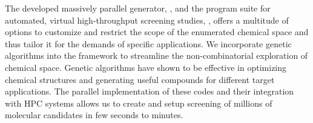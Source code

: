 \label{sec:conclusions4}

The developed massively parallel generator, \chemlg, and the program suite for automated, virtual high-throughput screening studies, \chemhtps, offers a multitude of options to customize and restrict the scope of the enumerated chemical space and thus tailor it for the demands of specific applications. We incorporate genetic algorithms into the framework to streamline the non-combinatorial exploration of chemical space. Genetic algorithms have shown to be effective in optimizing chemical structures and generating useful compounds for different target applications. The parallel implementation of these codes and their integration with HPC systems allows us to create and setup screening of millions of molecular candidates in few seconds to minutes. 
	 


